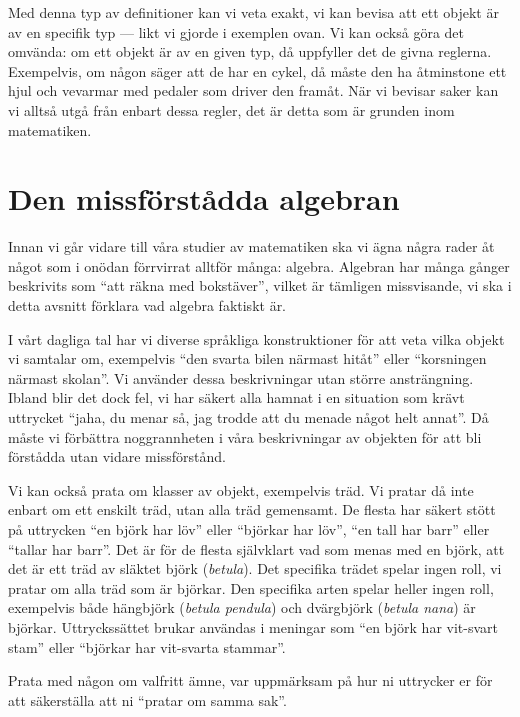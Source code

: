 Med denna typ av definitioner kan vi veta exakt, vi kan bevisa att ett objekt 
är av en specifik typ --- likt vi gjorde i exemplen ovan.
Vi kan också göra det omvända: om ett objekt är av en given typ, då uppfyller 
det de givna reglerna.
Exempelvis, om någon säger att de har en cykel, då måste den ha åtminstone ett 
hjul och vevarmar med pedaler som driver den framåt.
När vi bevisar saker kan vi alltså utgå från enbart dessa regler, det är detta 
som är grunden inom matematiken.


\section{Den missförstådda algebran}

Innan vi går vidare till våra studier av matematiken ska vi ägna några rader åt 
något som i onödan förrvirrat alltför många: algebra.
Algebran har många gånger beskrivits som \enquote{att räkna med bokstäver}, 
vilket är tämligen missvisande, vi ska i detta avsnitt förklara vad algebra 
faktiskt är.

I vårt dagliga tal har vi diverse språkliga konstruktioner för att veta vilka 
objekt vi samtalar om, exempelvis \enquote{den svarta bilen närmast hitåt} 
eller \enquote{korsningen närmast skolan}.
Vi använder dessa beskrivningar utan större ansträngning.
Ibland blir det dock fel, vi har säkert alla hamnat i en situation som krävt 
uttrycket \enquote{jaha, du menar så, jag trodde att du menade något helt 
  annat}.
Då måste vi förbättra noggrannheten i våra beskrivningar av objekten för att 
bli förstådda utan vidare missförstånd.

Vi kan också prata om klasser av objekt, exempelvis träd.
Vi pratar då inte enbart om ett enskilt träd, utan alla träd gemensamt.
De flesta har säkert stött på uttrycken \enquote{en björk har löv} eller 
\enquote{björkar har löv}, \enquote{en tall har barr} eller \enquote{tallar har 
barr}.
Det är för de flesta självklart vad som menas med en björk, att det är ett träd 
av släktet björk (\emph{betula}).
Det specifika trädet spelar ingen roll, vi pratar om alla träd som är björkar.
Den specifika arten spelar heller ingen roll, exempelvis både hängbjörk 
(\emph{betula pendula}) och dvärgbjörk (\emph{betula nana}) är björkar.
Uttryckssättet brukar användas i meningar som \enquote{en björk har vit-svart 
stam} eller \enquote{björkar har vit-svarta stammar}.

\begin{exercise}
  Prata med någon om valfritt ämne, var uppmärksam på hur ni uttrycker er för 
  att säkerställa att ni \enquote{pratar om samma sak}.
\end{exercise}

